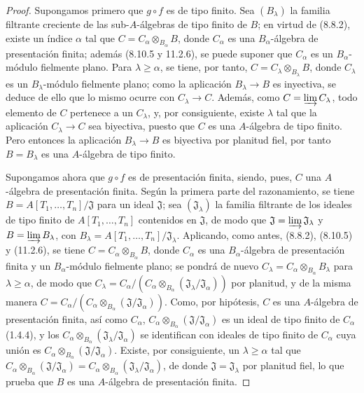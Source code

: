 \begin{proof}
Supongamos primero que $g\circ f$ es de tipo finito. Sea $(B_\lambda)$ la
familia filtrante creciente de las sub-$A$-álgebras de tipo finito de $B$; en
virtud de (8.8.2), existe un índice $\alpha$ tal que
$C=C_\alpha\otimes_{B_\alpha}B$, donde $C_\alpha$ es una
$B_\alpha$-álgebra de presentación finita; además (8.10.5 y 11.2.6), se puede
suponer que $C_\alpha$ es un $B_\alpha$-módulo fielmente plano. Para
$\lambda\geq\alpha$, se tiene, por tanto,
$C=C_\lambda\otimes_{B_\lambda}B$, donde $C_\lambda$ es un
$B_\lambda$-módulo fielmente plano; como la aplicación $B_\lambda\to B$ es
inyectiva, se deduce de ello que lo mismo ocurre con $C_\lambda\to C$. Además,
como $C=\varinjlim C_\lambda$, todo elemento de $C$ pertenece a un
$C_\lambda$, y, por consiguiente, existe $\lambda$ tal que la aplicación
$C_\lambda\to C$
sea biyectiva, puesto que $C$ es una $A$-álgebra de tipo finito. Pero entonces
la aplicación $B_\lambda\to B$ es biyectiva por planitud fiel, por tanto
$B=B_\lambda$ es una $A$-álgebra de tipo finito.

Supongamos ahora que $g\circ f$ es de presentación finita, siendo, pues, $C$
una $A$-álgebra de presentación finita. Según la primera parte del
razonamiento, se tiene
$B=A[T_1,\ldots,T_n]/\mathfrak J$
para un ideal $\mathfrak J$; sea
$(\mathfrak J_\lambda)$ la familia filtrante de los ideales de tipo
finito de $A[T_1,\ldots,T_n]$ contenidos en $\mathfrak J$, de modo
que $\mathfrak J=\varinjlim\mathfrak J_\lambda$ y
$B=\varinjlim B_\lambda$, con
$B_\lambda=A[T_1,\ldots,T_n]/\mathfrak J_\lambda$. Aplicando,
como antes, (8.8.2), (8.10.5) y (11.2.6), se tiene
$C=C_\alpha\otimes_{B_\alpha}B$, donde $C_\alpha$ es una
$B_\alpha$-álgebra de presentación finita y un $B_\alpha$-módulo fielmente
plano; se pondrá de nuevo $C_\lambda=C_\alpha\otimes_{B_\alpha}B_\lambda$ para
$\lambda\geq\alpha$, de modo que
$C_\lambda=C_\alpha/(C_\alpha\otimes_{B_\alpha}
(\mathfrak J_\lambda/\mathfrak J_\alpha))$
por planitud, y de la misma manera
$C=C_\alpha/(C_\alpha\otimes_{B_\alpha}
(\mathfrak J/\mathfrak J_\alpha))$.
Como, por hipótesis, $C$ es una $A$-álgebra de presentación finita, así como
$C_\alpha$, $C_\alpha\otimes_{B_\alpha}
(\mathfrak J/\mathfrak J_\alpha)$ es un ideal de
tipo finito de $C_\alpha$ (1.4.4), y los
$C_\alpha\otimes_{B_\alpha}
(\mathfrak J_\lambda/\mathfrak J_\alpha)$
se identifican con ideales de tipo finito de $C_\alpha$ cuya
unión es $C_\alpha\otimes_{B_\alpha}
(\mathfrak J/\mathfrak J_\alpha)$. Existe,
por consiguiente, un $\lambda\geq\alpha$ tal que
$C_\alpha\otimes_{B_\alpha}
(\mathfrak J/\mathfrak J_\alpha)
=C_\alpha\otimes_{B_\alpha}
(\mathfrak J_\lambda/\mathfrak J_\alpha)$,
de donde $\mathfrak J=\mathfrak J_\lambda$ por planitud
fiel, lo que prueba que $B$ es una $A$-álgebra de presentación finita.
\end{proof}

